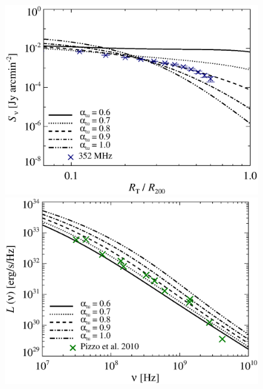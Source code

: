 \documentclass[fleqn,usenatbib,useAMS]{mnras}
\newcommand{\Mflatturb}{{\it M-turbulence}\xspace}
\begin{document}
\begin{figure}
\begin{minipage}{1\columnwidth}
\begin{center}
   \end{center}
\end{minipage}
\\
\begin{minipage}{1\columnwidth}
  \begin{center}%
    \includegraphics[width=\columnwidth]{prof.comp.KrTTDth.aI0.eps}
  \end{center}
\end{minipage}
\begin{minipage}{1\columnwidth}
   \begin{center}%
     \includegraphics[width=\columnwidth]{spec.comp.KrTTDth.aI0.eps}

\end{center}
\end{minipage}
\end{figure}
\end{document}
